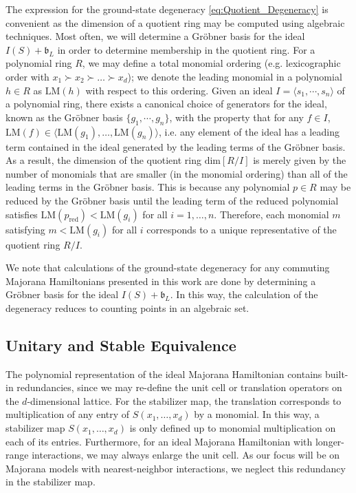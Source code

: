 \documentclass[aps,twocolumn,preprintnumbers,floatfix,showpacs,prx]{revtex4-1}
\begin{document}
The expression for the ground-state degeneracy \eqref{eq:Quotient_Degeneracy}
is convenient as the dimension of a quotient ring may be computed using algebraic techniques.
Most often, we will determine a Gr\"{o}bner basis for the ideal $I(S)+\mathfrak{b}_{L}$
in order to determine membership in the quotient ring.
For a polynomial ring $R$, we may define a total monomial ordering
(e.g. lexicographic order with $x_{1} \succ x_{2} \succ \ldots \succ x_{d}$);
we denote the leading monomial in a polynomial $h\in R$ as $\mathrm{LM}(h)$ with respect to this ordering.
Given an ideal $I = \langle s_{1}, \cdots, s_{n}\rangle$ of a polynomial ring,
there exists a canonical choice of generators for the ideal,
known as the Gr\"{o}bner basis $\{ g_{1}, \cdots, g_{n} \}$,
with the property that for any $f \in I$,
$\mathrm{LM}(f) \in \langle \mathrm{LM}(g_{1}),\ldots, \mathrm{LM}(g_{n})\rangle$,
i.e. any element of the ideal has a leading term contained in the ideal generated by the leading terms of the Gr\"{o}bner basis.
As a result, the dimension of the quotient ring $\mathrm{dim}[R/I]$
is merely given by the number of monomials that are smaller (in the monomial ordering) 
than all of the leading terms in the Gr\"{o}bner basis.
This is because any polynomial $p\in R$ may be reduced by the Gr\"{o}bner basis
until the leading term of the reduced polynomial satisfies $\mathrm{LM}(p_{\mathrm{red}}) < \mathrm{LM}(g_{i})$ for all $i = 1,\ldots,n$.
Therefore, each monomial $m$ satisfying $m < \mathrm{LM}(g_{i})$ for all $i$
corresponds to a unique representative of the quotient ring $R/I$.

We note that calculations of the ground-state degeneracy for any commuting Majorana Hamiltonians presented in this work are done by determining a Gr\"{o}bner basis for the ideal $I(S) + \mathfrak{b}_{L}$. In this way, the calculation of the degeneracy reduces to  counting points in an algebraic set.


\subsection{Unitary and Stable Equivalence}
The polynomial representation of the ideal Majorana Hamiltonian contains built-in redundancies,
since we may re-define the unit cell or translation operators on the $d$-dimensional lattice.
For the stabilizer map, the translation corresponds to multiplication of any entry of $S(x_{1},\ldots,x_{d})$ by a monomial. 
In this way, a stabilizer map $S(x_{1},\ldots,x_{d})$ is only defined up to monomial multiplication on each of its entries.
Furthermore, for an ideal Majorana Hamiltonian with longer-range interactions,
we may always enlarge the unit cell.
As our focus will be on Majorana models with nearest-neighbor interactions,
we neglect this redundancy in the stabilizer map.
\end{document}

